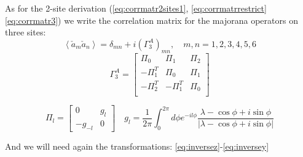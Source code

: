 \documentclass[10pt,a4paper]{article}
\begin{document}
As for the 2-site derivation (\ref{eq:corrmatr2sites1}, \ref{eq:corrmatrrestrict} \ref{eq:corrmatr3}) we write
the correlation matrix for the majorana operators on three sites:
\begin{equation}\label{eq:corrmatr3sites1}
\left\langle\check{a}_{m} \check{a}_{n}\right\rangle=\delta_{m n}+i\left(\Gamma_{3}^{A}\right)_{m n}, \quad m, n=1,2,3,4,5,6
\end{equation}
\begin{equation}\label{eq:corrmatr3sites2}
\Gamma_{3}^{A}=\left[\begin{array}{ccc}
\Pi_0 & \Pi_1 &\Pi_2\\
-\Pi_1^T & \Pi_0& \Pi_1\\
-\Pi_2^T & -\Pi_1^T& \Pi_0\\
\end{array}\right] 
\end{equation}

\begin{equation}
\Pi_{l}=\left[\begin{array}{cc}
0 & g_{l} \\
-g_{-l} & 0
\end{array}\right] 
\quad g_{l}=\frac{1}{2 \pi} \int_{0}^{2 \pi} d \phi e^{-i l \phi} \frac{\lambda-\cos \phi+i \sin \phi}{|\lambda-\cos\phi +i  \sin \phi|}\end{equation}

And we will need again the transformations: \ref{eq:inversez}-\ref{eq:inversey}
\end{document}

